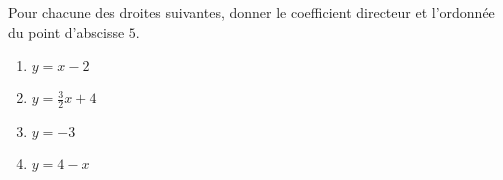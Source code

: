 
\begin{exercice}\label{exosmath-0608}

    Pour chacune des droites suivantes, donner le coefficient directeur et l'ordonnée du point d'abscisse \( 5\).
    \begin{multicols}{2}
        \begin{enumerate}
            \item
                \( y=x-2\)
            \item
                \( y=\frac{ 3 }{ 2 }x+4\)
            \item
                \( y=-3\)
            \item
                \( y=4-x\)
        \end{enumerate}
    \end{multicols}

\end{exercice}
